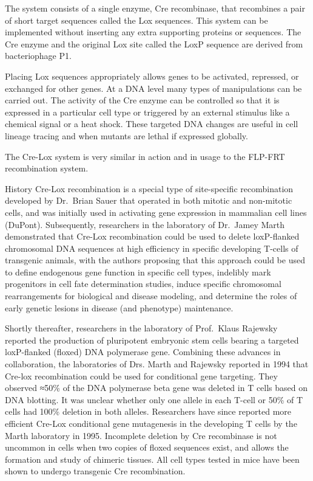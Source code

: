 The system consists of a single enzyme, Cre recombinase, that recombines a pair of short target sequences called the Lox sequences. This system can be implemented without inserting any extra supporting proteins or sequences. The Cre enzyme and the original Lox site called the LoxP sequence are derived from bacteriophage P1.

Placing Lox sequences appropriately allows genes to be activated, repressed, or exchanged for other genes. At a DNA level many types of manipulations can be carried out. The activity of the Cre enzyme can be controlled so that it is expressed in a particular cell type or triggered by an external stimulus like a chemical signal or a heat shock. These targeted DNA changes are useful in cell lineage tracing and when mutants are lethal if expressed globally.

The Cre-Lox system is very similar in action and in usage to the FLP-FRT recombination system.

History
Cre-Lox recombination is a special type of site-specific recombination developed by Dr.~Brian Sauer that operated in both mitotic and non-mitotic cells, and was initially used in activating gene expression in mammalian cell lines (DuPont). Subsequently, researchers in the laboratory of Dr.~Jamey Marth demonstrated that Cre-Lox recombination could be used to delete loxP-flanked chromosomal DNA sequences at high efficiency in specific developing T-cells of transgenic animals, with the authors proposing that this approach could be used to define endogenous gene function in specific cell types, indelibly mark progenitors in cell fate determination studies, induce specific chromosomal rearrangements for biological and disease modeling, and determine the roles of early genetic lesions in disease (and phenotype) maintenance.

Shortly thereafter, researchers in the laboratory of Prof.~Klaus Rajewsky reported the production of pluripotent embryonic stem cells bearing a targeted loxP-flanked (floxed) DNA polymerase gene. Combining these advances in collaboration, the laboratories of Drs. Marth and Rajewsky reported in 1994 that Cre-lox recombination could be used for conditional gene targeting. They observed ≈50\% of the DNA polymerase beta gene was deleted in T cells based on DNA blotting. It was unclear whether only one allele in each T-cell or 50\% of T cells had 100\% deletion in both alleles. Researchers have since reported more efficient Cre-Lox conditional gene mutagenesis in the developing T cells by the Marth laboratory in 1995. Incomplete deletion by Cre recombinase is not uncommon in cells when two copies of floxed sequences exist, and allows the formation and study of chimeric tissues. All cell types tested in mice have been shown to undergo transgenic Cre recombination.

